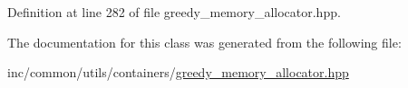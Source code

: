 Definition at line 282 of file greedy\+\_\+memory\+\_\+allocator.\+hpp.



The documentation for this class was generated from the following file\+:\begin{DoxyCompactItemize}
\item 
inc/common/utils/containers/\hyperlink{greedy__memory__allocator_8hpp}{greedy\+\_\+memory\+\_\+allocator.\+hpp}\end{DoxyCompactItemize}
